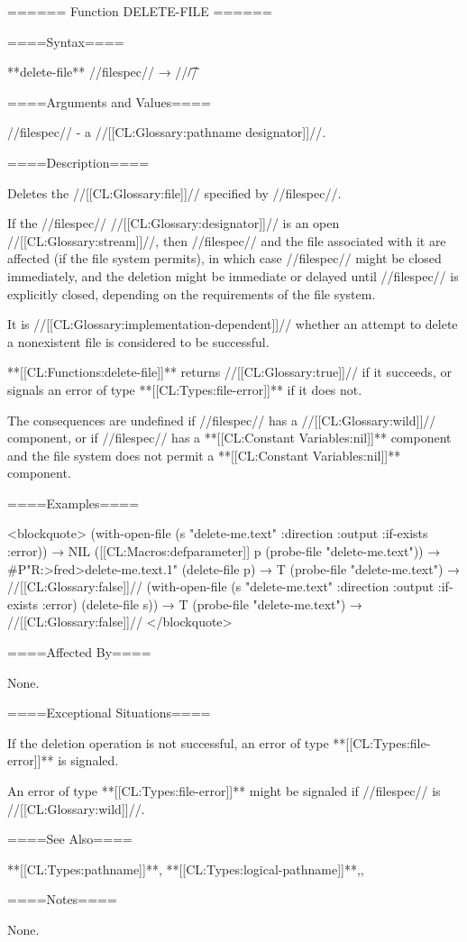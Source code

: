 ====== Function DELETE-FILE ======

====Syntax====

**delete-file** //filespec// → //\t//

====Arguments and Values====

//filespec// - a //[[CL:Glossary:pathname designator]]//.

====Description====

Deletes the //[[CL:Glossary:file]]// specified by //filespec//.

If the //filespec// //[[CL:Glossary:designator]]// is an open //[[CL:Glossary:stream]]//, then //filespec// and the file associated with it are affected (if the file system permits), in which case //filespec// might be closed immediately, and the deletion might be immediate or delayed until //filespec// is explicitly closed, depending on the requirements of the file system.

It is //[[CL:Glossary:implementation-dependent]]// whether an attempt to delete a nonexistent file is considered to be successful.

**[[CL:Functions:delete-file]]** returns //[[CL:Glossary:true]]// if it succeeds, or signals an error of type **[[CL:Types:file-error]]** if it does not.

The consequences are undefined if //filespec// has a //[[CL:Glossary:wild]]// component, or if //filespec// has a **[[CL:Constant Variables:nil]]** component and the file system does not permit a **[[CL:Constant Variables:nil]]** component.

====Examples====

<blockquote> (with-open-file (s "delete-me.text" :direction :output :if-exists :error)) → NIL ([[CL:Macros:defparameter]] p (probe-file "delete-me.text")) → #P"R:>fred>delete-me.text.1" (delete-file p) → T (probe-file "delete-me.text") → //[[CL:Glossary:false]]// (with-open-file (s "delete-me.text" :direction :output :if-exists :error) (delete-file s)) → T (probe-file "delete-me.text") → //[[CL:Glossary:false]]// </blockquote>

====Affected By====

None.

====Exceptional Situations====

If the deletion operation is not successful, an error of type **[[CL:Types:file-error]]** is signaled.

An error of type **[[CL:Types:file-error]]** might be signaled if //filespec// is //[[CL:Glossary:wild]]//.

====See Also====

**[[CL:Types:pathname]]**, **[[CL:Types:logical-pathname]]**,{\secref\FileSystemConcepts},

{\secref\PathnamesAsFilenames}

====Notes====

None.


   
